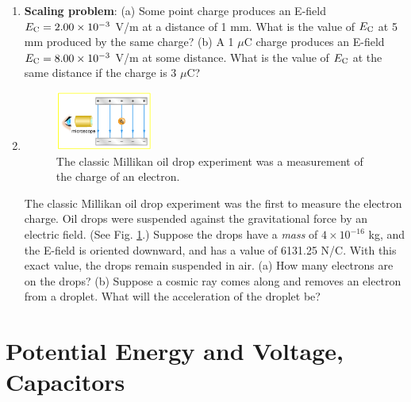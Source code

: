 \documentclass[10pt]{article}
\begin{document}
\begin{enumerate}
\item \textbf{Scaling problem}: (a) Some point charge produces an E-field $E_{\rm C} = 2.00 \times 10^{-3}$ V/m at a distance of 1 mm. What is the value of $E_{\rm C}$ at 5 mm produced by the same charge? (b) A 1 $\mu$C charge produces an E-field $E_{\rm C} = 8.00 \times 10^{-3}$ V/m at some distance.  What is the value of $E_{\rm C}$ at the same distance if the charge is 3 $\mu$C? \\ \vspace{4cm}
\item 
\begin{figure}
\centering
\includegraphics[width=0.3\textwidth]{figures/mill.jpeg}
\caption{\label{fig:mill} The classic Millikan oil drop experiment was a measurement of the charge of an electron.}
\end{figure}
The classic Millikan oil drop experiment was the first to measure the electron charge. Oil drops were suspended against the gravitational force by an electric field. (See Fig. \ref{fig:mill}.) Suppose the drops have a \textit{mass} of $4\times 10^{-16}$ kg, and the E-field is oriented downward, and has a value of 6131.25 N/C.  With this exact value, the drops remain suspended in air.  (a)  How many electrons are on the drops?  (b) Suppose a cosmic ray comes along and removes an electron from a droplet.  What will the acceleration of the droplet be? \\ \vspace{4cm}
\end{enumerate}

\section{Potential Energy and Voltage, Capacitors}
\end{document}
